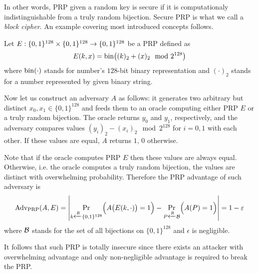In other words, PRP given a random key is secure if it is computationaly indistinguishable from a truly random bijection. Secure PRP is what we call a {\em block cipher}. An example covering most introduced concepts follows.

\begin{example}
	Let $E:\{0,1\}^{128}\times\{0,1\}^{128}\rightarrow\{0,1\}^{128}$ be a PRP defined as
	\[
		E(k,x) = \operatorname*{bin}\bigl((k)_2 + (x)_2 \mod{2^{128}}\bigr)
	\]
	where $\operatorname*{bin}(\cdot)$ stands for number's $128$-bit binary representation and $(\cdot)_2$ stands for a number represented by given binary string.
	
	Now let us construct an adversary $A$ as follows: it generates two arbitrary but distinct $x_0,x_1\in\{0,1\}^{128}$ and feeds them to an oracle computing either PRP $E$ or a truly random bijection. The oracle returns $y_0$ and $y_1$, respectively, and the adversary compares values $(y_i)_2 - (x_i)_2 \mod{2^{128}}$ for $i=0,1$ with each other. If these values are equal, $A$ returns $1$, $0$ otherwise.
	
	Note that if the oracle computes PRP $E$ then these values are always equal. Otherwise, i.e. the oracle computes a truly random bijection, the values are distinct with overwhelming probability. Therefore the PRP advantage of such adversary is
	\[
		\operatorname*{Adv_{PRP}}(A,E) = \left| \Pr\limits_{k\xleftarrow{R} \{0,1\}^{128}}\Bigl(A\bigl(E(k,\cdot)\bigr)=1\Bigr) - \Pr\limits_{P\xleftarrow{R} {\cal B}}\Bigl(A(P)=1\Bigr) \right| = 1 - \varepsilon
	\]
	where $\cal B$ stands for the set of all bijections on $\{0,1\}^{128}$ and $\epsilon$ is negligible.
	
	It follows that such PRP is totally insecure since there exists an attacker with overwhelming advantage and only non-negligible advantage is required to break the PRP.
\end{example}

